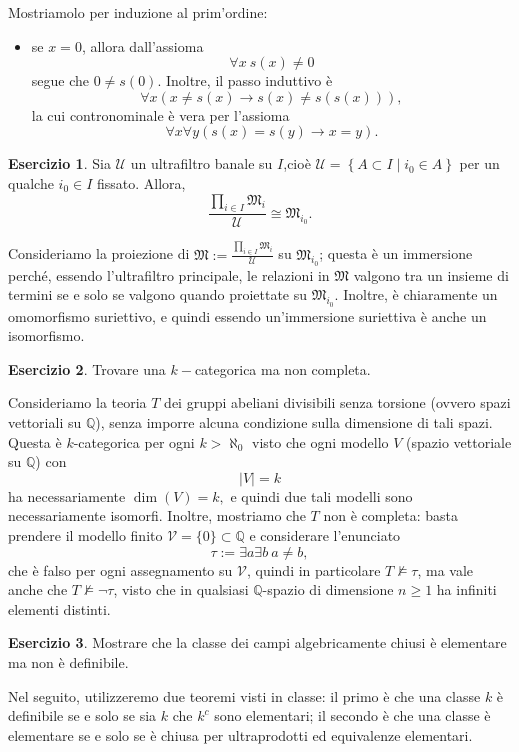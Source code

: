 \documentclass[a4paper]{article}
\newcommand{\Q}{\mathbb{Q}}
\newcommand{\limplies}{\rightarrow}
\theoremstyle{definition}
\theoremstyle{definition}
\theoremstyle{remark}
\theoremstyle{definition}
\newtheorem*{exercise*}{Esercizio}
\begin{document}
Mostriamolo per induzione al prim'ordine:
\begin{itemize}
	\item se $x=0$, allora dall'assioma $$ \forall x~s(x)\neq 0 $$ segue che $0\neq s(0)$. Inoltre, il passo induttivo è $$ \forall x \left( x\neq s(x) \limplies
	s(x)\neq s(s(x)) \right) ,$$ la cui contronominale è vera per l'assioma $$\forall x \forall y (s(x)=s(y)\limplies x=y).$$
\end{itemize}
\begin{exercise*}
	Sia $\mathcal{U}$ un ultrafiltro banale su  $I$,cioè $\mathcal{U}=\left\{ A\subset I\mid i_0\in A \right\} $ per un qualche $i_0\in I$ fissato. Allora, $$ \frac{\prod_{i\in
	I}{\mathfrak{M}_i}}{\mathcal{U}}\cong \mathfrak{M}_{i_0} .$$
\end{exercise*}
Consideriamo la proiezione di $\mathfrak{M}:=\frac{\prod_{i\in
I}{\mathfrak{M}_i}}{\mathcal{U}}$ su $\mathfrak{M}_{i_0}$; questa è un immersione perché, essendo l'ultrafiltro principale, le relazioni in $\mathfrak{M}$ valgono tra un insieme di
termini se e solo se
valgono quando proiettate su $\mathfrak{M}_{i_0}$. Inoltre, è chiaramente un omomorfismo suriettivo, e quindi essendo un'immersione suriettiva è anche un isomorfismo.
\begin{exercise*}
	Trovare una $k-$categorica ma non completa.
\end{exercise*}
Consideriamo la teoria $T$ dei gruppi abeliani divisibili senza torsione (ovvero spazi vettoriali su $\Q$), senza imporre alcuna condizione sulla dimensione di tali spazi. Questa è
$k$-categorica per ogni $k>\aleph_0$ visto che ogni modello $V$ (spazio vettoriale su $\Q$) con $$ |V|=k $$ ha necessariamente $\operatorname{dim}(V)=k ,$ e quindi due tali modelli
sono necessariamente isomorfi. Inoltre, mostriamo che $T$ non è completa: basta prendere il modello finito $\mathcal{V}=\{0\}\subset \Q$ e considerare l'enunciato $$ \tau:=\exists a \exists b~a\neq b
,$$ che è falso per ogni assegnamento su $\mathcal{V}$, quindi in particolare $T\not\models\tau$, ma vale anche che $T\not\models\lnot\tau$, visto che in qualsiasi  $\Q$-spazio di
dimensione $n\geq 1$ ha infiniti elementi distinti.
\begin{exercise*}
	Mostrare che la classe dei campi algebricamente chiusi è elementare ma non è definibile.
\end{exercise*}
Nel seguito, utilizzeremo due teoremi visti in classe: il primo è che una classe $k$ è definibile se e solo se sia $k$ che $k^c$ sono elementari; il secondo è che una classe è
elementare se e solo se è chiusa per ultraprodotti ed equivalenze elementari.
\end{document}
